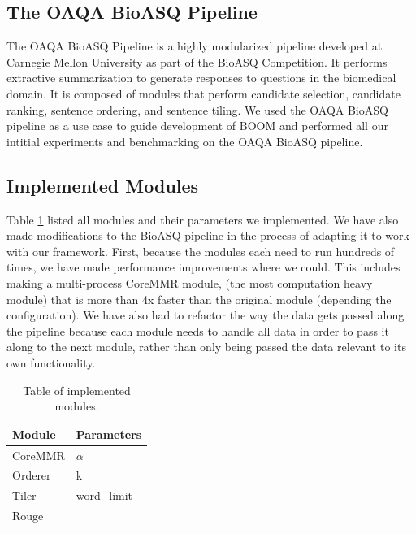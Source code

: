 \documentclass{article}
\begin{document}
    \subsection{The OAQA BioASQ Pipeline}
    The OAQA BioASQ Pipeline \cite{chandu2017tackling} is a highly modularized pipeline developed at Carnegie Mellon University as part of the BioASQ Competition. It performs
    extractive summarization to generate responses to questions in the biomedical domain. It is composed of modules that perform candidate selection, candidate ranking, sentence ordering,
    and sentence tiling. We used the OAQA BioASQ pipeline as a use case to guide development of BOOM and performed all our intitial experiments and benchmarking on the OAQA BioASQ pipeline.

    \subsection{Implemented Modules}
        Table \ref{tbl:modules} listed all modules and their parameters we implemented.
        We have also made modifications to the BioASQ pipeline in the process of adapting it to work with our framework.
        First, because the modules each need to run hundreds of times, we have made performance improvements where we could. This includes
        making a multi-process CoreMMR module, (the most computation heavy module) that is more than 4x faster than the original module (depending the configuration).
        We have also had to refactor the way the data gets passed along the pipeline because each module needs to handle all data in order to pass it
        along to the next module, rather than only being passed the data relevant to its own functionality.

        \begin{table}[h]
            \centering
            \begin{tabular}{|l|l|}
                \hline
                Module  & Parameters \\ \hline
                CoreMMR & $\alpha$           \\ \hline
                Orderer &  k          \\ \hline
                Tiler   &  word\_limit          \\ \hline
                Rouge   &            \\ \hline
            \end{tabular}
            \caption{Table of implemented modules.}
            \label{tbl:modules}
        \end{table}
\end{document}

